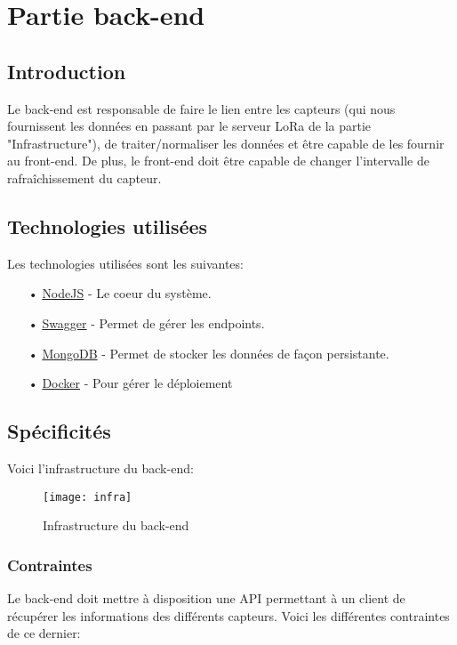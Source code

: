 \chapter{Partie back-end}
\label{chap:back-end}

\section{Introduction}

Le back-end est responsable de faire le lien entre les capteurs (qui nous fournissent les données en passant par le serveur LoRa de la partie "Infrastructure"), de traiter/normaliser les données et être capable de les fournir au front-end. De plus, le front-end doit être capable de changer l'intervalle de rafraîchissement du capteur.

\section{Technologies utilisées}

Les technologies utilisées sont les suivantes:

\begin{itemize}
\item[•] \href{https://nodejs.org/en/}{NodeJS} - Le coeur du système.
\item[•] \href{https://swagger.io/}{Swagger} - Permet de gérer les endpoints.
\item[•] \href{https://www.mongodb.com/}{MongoDB} - Permet de stocker les données de façon persistante.
\item[•] \href{https://www.docker.com}{Docker} - Pour gérer le déploiement
\end{itemize}

\section{Spécificités}

Voici l'infrastructure du back-end:

\begin{figure}[h!]
\centering
\texttt{[image: infra]}
\caption{Infrastructure du back-end}
\end{figure}
    
\subsection{Contraintes}

Le back-end doit mettre à disposition une API permettant à un client de récupérer les informations des différents capteurs. Voici les différentes contraintes de ce dernier:

